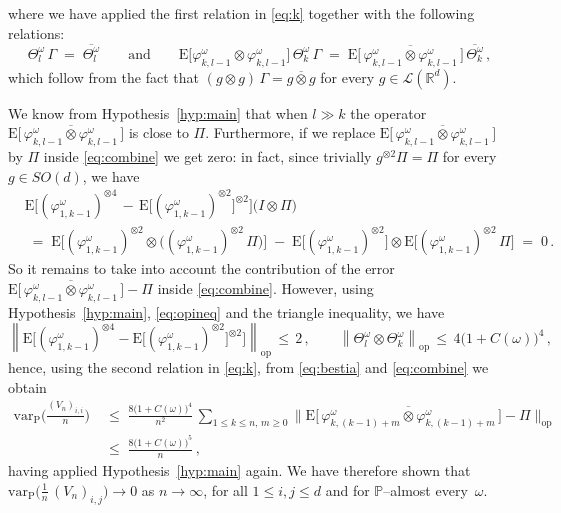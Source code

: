 \documentclass[a4paper,reqno,11pt]{amsart}
\numberwithin{equation}{section}
\newcommand{\bbP}{{\ensuremath{\mathbb P}} }
\newcommand{\cL}{{\ensuremath{\mathcal L}} }
\newcommand{\go}{\omega}
\newcommand{\R}{\mathbb{R}}
\def\bP{\ensuremath{\bs{\mathrm{P}}}}
\def\bE{\ensuremath{\bs{\mathrm{E}}}}
\def\bs{\boldsymbol}
\renewcommand{\phi}{\varphi}
\begin{document}
where we have applied the first relation in \eqref{eq:k} together with
the following relations:
\begin{equation}
	\Theta^\go_l \, \Gamma \;=\; \overline{\Theta^\go_l} \qquad \text{and} \qquad
	\bE\big[ \phi_{k,l-1}^\go \otimes \phi_{k,l-1}^\go \big] \, \Theta^\go_k \, \Gamma
	\;=\; \bE\big[\, \overline{\phi_{k,l-1}^\go \otimes \phi_{k,l-1}^\go} \, \big] \, 
	\overline{\Theta^\go_k} \,,
\end{equation}
which follow from the fact that $(g \otimes g) \, \Gamma = \overline{g \otimes g}$
for every $g \in \cL(\R^d)$.


We know from Hypothesis~\ref{hyp:main} that when $l \gg k$ the operator
$\bE\big[\, \overline{\phi_{k,l-1}^\go \otimes \phi_{k,l-1}^\go} \, \big]$ is close to $\Pi$.
Furthermore, if we replace $\bE\big[\, \overline{\phi_{k,l-1}^\go \otimes \phi_{k,l-1}^\go} \, \big]$
by $\Pi$ inside \eqref{eq:combine} we get zero: in fact, since trivially
$g^{\otimes 2} \Pi = \Pi$ for every $g \in SO(d)$, we have
\begin{equation}
\begin{split}
	&\bE \Big[(\phi_{1,k-1}^\go)^{\otimes 4} \, - \, 
	\bE \big[ (\phi_{1,k-1}^\go)^{\otimes 2} \big]^{\otimes 2} \Big] 
	\big( I \otimes \Pi \big)\\
	& \;=\; \bE \big[(\phi_{1,k-1}^\go)^{\otimes 2} \otimes
	\big( (\phi_{1,k-1}^\go)^{\otimes 2}\, \Pi \big) \big] \; - \;
	\bE \big[ (\phi_{1,k-1}^\go)^{\otimes 2} \big] \otimes
	\bE \big[ (\phi_{1,k-1}^\go)^{\otimes 2} \, \Pi \big] \; =\; 0 \,.
\end{split}
\end{equation}
So it remains to take into account the contribution of the error 
$\bE\big[ \, \overline{\phi_{k,l-1}^\go \otimes \phi_{k,l-1}^\go} \, \big] - \Pi$
inside \eqref{eq:combine}.
However, using Hypothesis~\ref{hyp:main}, \eqref{eq:opineq} and the triangle inequality,
we have
\begin{equation}
	\left\|
	\bE \Big[(\phi_{1,k-1}^\go)^{\otimes 4} - 
	\bE \big[ (\phi_{1,k-1}^\go)^{\otimes 2} \big]^{\otimes 2} \Big]
	\right\|_{\text{op}} \, \le \, 2 \,, \qquad
	\left\|\Theta^\go_l \otimes \Theta^\go_k\right\|_{\text{op}}
	\, \le \, 4 \big(1+C(\go)\big)^4 \,,
\end{equation}
hence, using the second relation
in \eqref{eq:k}, from \eqref{eq:bestia} and \eqref{eq:combine} we obtain
\begin{equation}
\begin{split}
	\mathrm{var}_{\bP} \bigg( \frac{(V_n)_{i,i}}{n} \bigg)
	& \;\le\; \frac{8 \big(1+C(\go)\big)^4}{n^2} \, 
	\sum_{1 \le k \le n , \, m \ge 0} \big\|
	\bE\big[ \, \overline{\phi_{k,(k-1)+m}^\go \otimes \phi_{k,(k-1)+m}^\go} \, \big] - \Pi
	\big\|_{\text{op}}\\
	& \;\le\; \frac{8 \big(1+C(\go)\big)^5}{n} \,,
\end{split}
\end{equation}
having applied Hypothesis~\ref{hyp:main} again.
We have therefore shown that
$\mathrm{var}_{\bP} \big( \frac 1n \, (V_n)_{i,j} \big) \to 0$ as $n \to\infty$,
for all $1 \le i,j \le d$ and for $\bbP$--almost every~$\go$.
\end{document}
